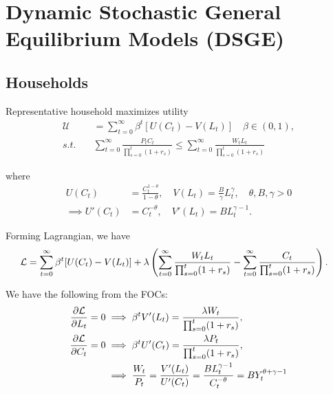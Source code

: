 \documentclass[../main.tex]{subfiles}
\begin{document}
        
    \renewcommand{\thesection}{\arabic{chapter}.\arabic{section}}
    
    \chapter{Dynamic Stochastic General Equilibrium Models (DSGE)}
        
    \section{Households}
        Representative household maximizes utility
        \begin{align}
            \mathcal{U} &= \sum_{t=0}^{\infty} \beta^{t} [U(C_t) - V(L_t)]
            \quad \beta \in (0, 1),
            \\
            s.t. \quad &
            \sum_{t=0}^{\infty} \frac{P_t C_t}{\prod_{s=0}^{t}(1+r_{s})} \le
            \sum_{t=0}^{\infty} \frac{W_t L_t}{\prod_{s=0}^{t}(1+r_{s})}
        \end{align}
        
        where
        \begin{align}
            U(C_t) &= \frac{C_t^{1-\theta}}{1-\theta},
            \quad
            V(L_t) = \frac{B}{\gamma} L_t^\gamma, 
            \quad 
            \theta, B, \gamma > 0
            \\
            \implies
            U'(C_t) &= C_t^{-\theta},
            \quad
            V'(L_t) = B L_t^{\gamma - 1}.
        \end{align}
        
        Forming Lagrangian, we have
        \begin{align}
            \mathcal{L} &= \sum_{t=0}^{\infty} \beta^{t} [U(C_t) - V(L_t)] + \lambda 
            \left(
                \sum_{t=0}^{\infty} \frac{W_t L_t}{\prod_{s=0}^{t}(1+r_{s})}
                - 
                \sum_{t=0}^{\infty} \frac{C_t}{\prod_{s=0}^{t}(1+r_{s})}
            \right).
        \end{align}
        
        We have the following from the FOCs:
        \begin{align}
            \frac{\partial \mathcal{L}}{\partial L_t} = 0
            &\implies
            \beta^t V'(L_t) = \frac{\lambda W_t}{\prod_{s=0}^{t}(1+r_{s})},
            \\
            \frac{\partial \mathcal{L}}{\partial C_t} = 0
            &\implies
            \beta^t U'(C_t) = \frac{\lambda P_t}{\prod_{s=0}^{t}(1+r_{s})},
            \\
            &\implies
            \frac{W_t}{P_t} = \frac{V'(L_t)}{U'(C_t)}
            = \frac{BL_t^{\gamma - 1}}{C_t^{-\theta}}
            = B Y_t ^{\theta + \gamma - 1}
            \label{eqn:dsge-eqm-wage}
        \end{align}
        
\end{document}
